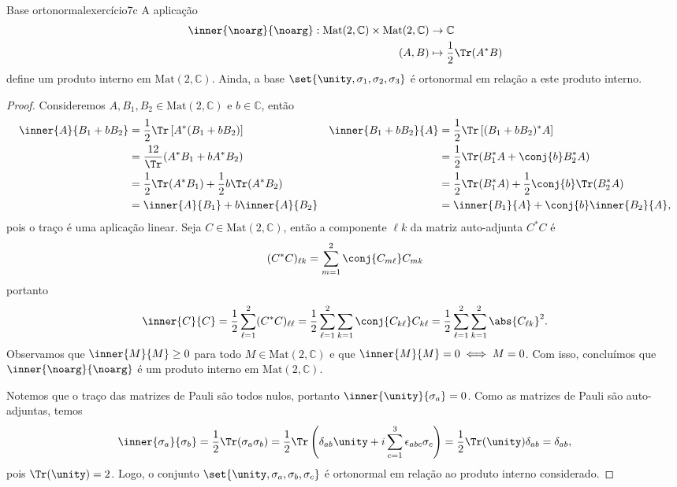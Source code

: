 \begin{proposition}{Base ortonormal}{exercício7c}
    A aplicação
    \begin{align*}
        \inner{\noarg}{\noarg} : \mathrm{Mat}(2, \mathbb{C}) \times \mathrm{Mat}(2, \mathbb{C})
        &\to \mathbb{C}\\
        (A, B) &\mapsto \frac12\Tr(A^*B)
    \end{align*}
    define um produto interno em \(\mathrm{Mat}(2, \mathbb{C})\). Ainda, a base \(\set{\unity, \sigma_1, \sigma_2, \sigma_3}\) é ortonormal em relação a este produto interno.
\end{proposition}
\begin{proof}
    Consideremos \(A, B_1, B_2 \in \mathrm{Mat}(2, \mathbb{C})\) e \(b \in \mathbb{C}\), então
    \begin{align*}
        \inner{A}{B_1 + b B_2} &= \frac12 \Tr\left[A^*(B_1 + b B_2)\right]&
        \inner{B_1 + bB_2}{A} &= \frac12 \Tr\left[(B_1 + b B_2)^*A\right] \\
                              &= \frac{12}\Tr(A^* B_1 + b A^* B_2)&
                              &= \frac12\Tr(B_1^*A + \conj{b} B_2^*A)\\
                              &= \frac12 \Tr(A^*B_1) + \frac12b\Tr(A^*B_2)&
                              &= \frac12 \Tr(B_1^*A) + \frac12\conj{b}\Tr(B_2^*A) \\
                              &= \inner{A}{B_1} + b \inner{A}{B_2}&
                              &= \inner{B_1}{A} + \conj{b} \inner{B_2}{A},
    \end{align*}
    pois o traço é uma aplicação linear. Seja \(C \in \mathrm{Mat}(2, \mathbb{C})\), então a componente \(\ell k\) da matriz auto-adjunta \(C^*C\) é
    \begin{equation*}
        (C^*C)_{\ell k} = \sum_{m = 1}^2 \conj{C_{m\ell}}C_{mk}
    \end{equation*}
    portanto
    \begin{equation*}
        \inner{C}{C} = \frac12 \sum_{\ell = 1}^{2} (C^*C)_{\ell\ell} = \frac12 \sum_{\ell=1}^2 \sum_{k = 1} \conj{C_{k\ell}}C_{k\ell} = \frac12 \sum_{\ell = 1}^2 \sum_{k=1}^2 \abs{C_{\ell k}}^2.
    \end{equation*}
    Observamos que \(\inner{M}{M} \geq 0\) para todo \(M \in \mathrm{Mat}(2, \mathbb{C})\) e que \(\inner{M}{M} = 0 \iff M = 0\). Com isso, concluímos que \(\inner{\noarg}{\noarg}\) é um produto interno em \(\mathrm{Mat}(2, \mathbb{C})\).

    Notemos que o traço das matrizes de Pauli são todos nulos, portanto \(\inner{\unity}{\sigma_a} = 0\). Como as matrizes de Pauli são auto-adjuntas, temos
    \begin{equation*}
        \inner{\sigma_a}{\sigma_b} = \frac12 \Tr(\sigma_a \sigma_b) = \frac12 \Tr\left(\delta_{ab} \unity + i \sum_{c=1}^3 \epsilon_{abc} \sigma_c\right) = \frac12 \Tr(\unity) \delta_{ab} = \delta_{ab},
    \end{equation*}
    pois \(\Tr(\unity) = 2\). Logo, o conjunto \(\set{\unity, \sigma_a, \sigma_b, \sigma_c}\) é ortonormal em relação ao produto interno considerado.
\end{proof}

